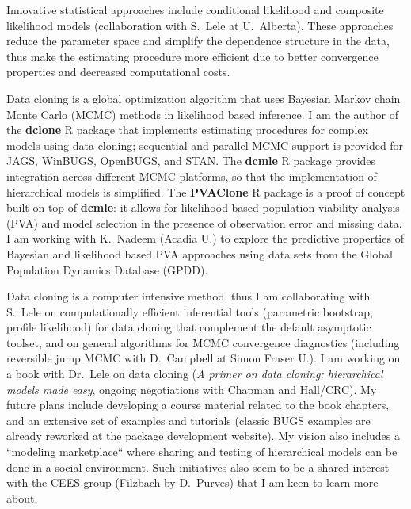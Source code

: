 Innovative statistical approaches include conditional likelihood and composite likelihood models (collaboration with S.~Lele at U.~Alberta). These approaches reduce the parameter space and simplify the dependence structure in the data, thus make the estimating procedure more efficient due to better convergence properties and decreased computational costs.
\vspace{0.5pc}

Data cloning is a global optimization algorithm that uses Bayesian Markov chain Monte Carlo (MCMC) methods in likelihood based inference.
I am the author of the \textbf{dclone} R package
that implements estimating procedures for complex models using data cloning; sequential and parallel MCMC support is provided for JAGS, WinBUGS, OpenBUGS, and STAN.
The \textbf{dcmle} R package provides integration across different MCMC platforms, so that the implementation of hierarchical models is simplified. The \textbf{PVAClone} R package is a proof of concept built on top of \textbf{dcmle}: it allows for likelihood based population viability analysis (PVA) and model selection in the presence of observation error and missing data. I am working with K.~Nadeem (Acadia U.) to explore the predictive properties of Bayesian and likelihood based PVA approaches using data sets from the Global Population Dynamics Database (GPDD).
\vspace{0.5pc}

Data cloning is a computer intensive method, thus I am collaborating with S.~Lele on computationally efficient inferential tools (parametric bootstrap, profile likelihood) for data cloning that complement the default asymptotic toolset, and on general algorithms for MCMC convergence diagnostics (including reversible jump MCMC with  D.~Campbell at Simon Fraser U.).
I am working on a book with Dr.~Lele on data cloning 
(\emph{A primer on data cloning: hierarchical models made easy}, ongoing negotiations with Chapman and Hall/CRC).
My future plans include developing a course material related to the book chapters, and an extensive set of examples and tutorials (classic BUGS examples are already reworked at the package development website). My vision also includes a ``modeling marketplace`` where sharing and testing of hierarchical models can be done in a social environment. Such initiatives also seem to be a shared interest with the CEES group (Filzbach by D.~Purves) that I am keen to learn more about.
